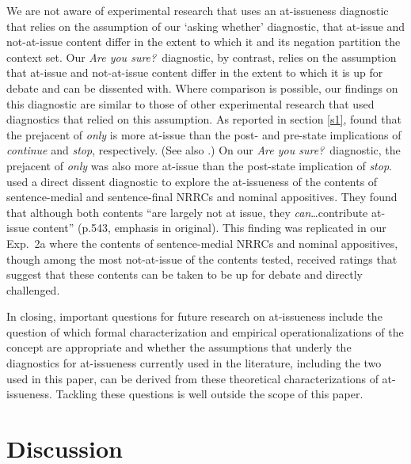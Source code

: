 \documentclass[11pt,fleqn]{article}
\newcommand{\6}{\mbox{$[\hspace*{-.6mm}[$}}
\newcommand{\9}{\mbox{$]\hspace*{-.6mm}]$}}
\begin{document}
We are not aware of experimental research that uses an at-issueness diagnostic that relies on the assumption of our `asking whether' diagnostic, that at-issue and not-at-issue content differ in the extent to which it and its negation partition the context set. Our {\em Are you sure?}~diagnostic, by contrast, relies on the assumption that at-issue and not-at-issue content differ in the extent to which it is up for debate and can be dissented with. Where comparison is possible, our findings on this diagnostic are similar to those of other experimental research that used diagnostics that relied on this assumption. As reported in section \ref{s1}, \citet{amaral-etal11} found that the prejacent of {\em only} is more at-issue than the post- and pre-state implications of {\em continue} and {\em stop}, respectively. (See also \citealt{cummins-etal2012}.) On our {\em Are you sure?}~diagnostic, the prejacent of {\em only} was also more at-issue than the post-state implication of {\em stop}. \citet{syrett-koev2015} used a direct dissent diagnostic to explore the at-issueness of the contents of sentence-medial and sentence-final NRRCs and nominal appositives. They found that although both contents ``are largely not at issue, they {\em can}\ldots contribute at-issue content'' (p.543, emphasis in original). This finding was replicated in our Exp.~2a where the contents of sentence-medial NRRCs and nominal appositives, though among the most not-at-issue of the contents tested, received ratings that suggest that these contents can be taken to be up for debate and directly challenged.

In closing, important questions for future research on at-issueness include the question of which formal characterization and empirical operationalizations of the concept are appropriate and whether the assumptions that underly the diagnostics for at-issueness currently used in the literature, including the two used in this paper, can be derived from these theoretical characterizations of at-issueness. Tackling these questions is well outside the scope of this paper.
 

\section{Discussion}\label{s5}
\end{document}
